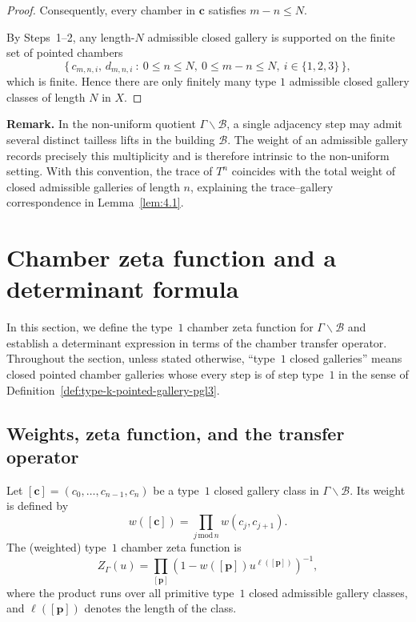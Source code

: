 \documentclass[11pt]{amsart}
\theoremstyle{definition}
\theoremstyle{remark}
\numberwithin{equation}{section}
\begin{document}
\begin{proof}
Consequently, every chamber in $\mathbf{c}$ satisfies $m-n\le N$.

\medskip
\noindent By Steps~1--2, any length-$N$ admissible closed gallery is supported on the finite set of pointed chambers
\[
\{\,c_{m,n,i},\,d_{m,n,i}\ :\ 0\le n\le N,\ 0\le m-n\le N,\ i\in\{1,2,3\}\,\},
\]
which is finite.  Hence there are only finitely many type $1$ admissible closed gallery classes of length $N$ in $X$.
\end{proof}


\noindent
\textbf{Remark.}
In the non-uniform quotient $\Gamma\backslash \mathcal{B}$, a single adjacency step may admit
several distinct tailless lifts in the building $\mathcal{B}$.
The weight of an admissible gallery records precisely this multiplicity and is therefore
intrinsic to the non-uniform setting.
With this convention, the trace of $T^n$ coincides with the total weight of closed
admissible galleries of length $n$, explaining the trace--gallery correspondence in
Lemma~\ref{lem:4.1}.


\section{Chamber zeta function and a determinant formula}\label{sec:4}

In this section, we define the type~$1$ chamber zeta function for $\Gamma\backslash\mathcal{B}$
and establish a determinant expression in terms of the chamber transfer operator. Throughout the section, unless stated otherwise, ``type~$1$ closed galleries'' means closed pointed chamber
galleries whose every step is of step type~$1$ in the sense of Definition~\ref{def:type-k-pointed-gallery-pgl3}.


\subsection{Weights, zeta function, and the transfer operator}

Let $[\mathbf{c}]=(c_0,\ldots,c_{n-1},c_n)$ be a type~$1$ closed gallery class in $\Gamma\backslash\mathcal{B}$.
Its weight is defined by
\[
w([\mathbf{c}])=\prod_{j \,\mathrm{mod}\, n} w(c_j,c_{j+1}).
\]
The (weighted) type~$1$ chamber zeta function is
\[
Z_{\Gamma}(u)=\prod_{[\mathbf{p}]}
\left(1-w([\mathbf{p}])u^{\ell([\mathbf{p}])}\right)^{-1},
\]
where the product runs over all primitive type~$1$ closed admissible gallery classes,
and $\ell([\mathbf{p}])$ denotes the length of the class.
\end{document}
